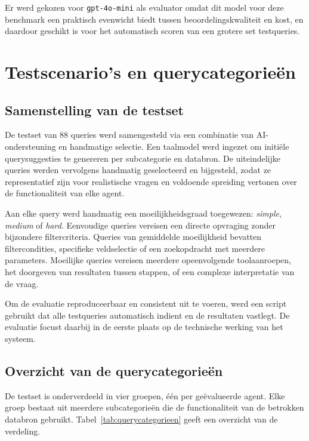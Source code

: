 Er werd gekozen voor \texttt{gpt-4o-mini} als evaluator omdat dit model voor deze benchmark een praktisch evenwicht biedt tussen beoordelingskwaliteit en kost, en daardoor geschikt is voor het automatisch scoren van een grotere set testqueries.

\section{Testscenario's en querycategorieën}
\label{sec:testscenarios}

\subsection{Samenstelling van de testset}
\label{subsec:testset-samenstelling}

De testset van 88 queries werd samengesteld via een combinatie van \gls{AI}-ondersteuning en handmatige selectie. Een taalmodel werd ingezet om initiële querysuggesties te genereren per subcategorie en databron. De uiteindelijke queries werden vervolgens handmatig geselecteerd en bijgesteld, zodat ze representatief zijn voor realistische vragen en voldoende spreiding vertonen over de functionaliteit van elke agent.

Aan elke query werd handmatig een moeilijkheidsgraad toegewezen: \textit{simple}, \textit{medium} of \textit{hard}. Eenvoudige queries vereisen een directe opvraging zonder bijzondere filtercriteria. Queries van gemiddelde moeilijkheid bevatten filtercondities, specifieke veldselectie of een zoekopdracht met meerdere parameters. Moeilijke queries vereisen meerdere opeenvolgende toolaanroepen, het doorgeven van resultaten tussen stappen, of een complexe interpretatie van de vraag.

Om de evaluatie reproduceerbaar en consistent uit te voeren, werd een script gebruikt dat alle testqueries automatisch indient en de resultaten vastlegt. De evaluatie focust daarbij in de eerste plaats op de technische werking van het systeem.

\subsection{Overzicht van de querycategorieën}
\label{subsec:querycategorieen}

De testset is onderverdeeld in vier groepen, één per geëvalueerde agent. Elke groep bestaat uit meerdere subcategorieën die de functionaliteit van de betrokken databron gebruikt. Tabel~\ref{tab:querycategorieen} geeft een overzicht van de verdeling.

